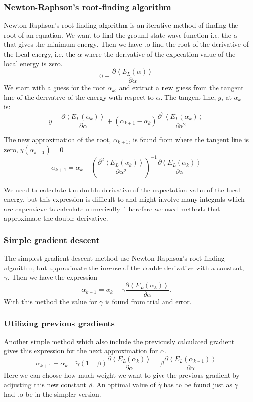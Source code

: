 \subsubsection{Newton-Raphson's root-finding algorithm}
Newton-Raphson's root-finding algorithm is an iterative method of finding the root of an equation. We want to find the ground state wave function i.e. the $\alpha$ that gives the minimum energy. Then we have to find the root of the derivative of the local energy, i.e. the $\alpha$ where the derivative of the expecation value of the local energy is zero.
$$ 0 = \frac{\partial \left<E_L(\alpha)\right>}{\partial \alpha}$$
We start with a guess for the root $\alpha_k$, and extract a new guess from the tangent line of the derivative of the energy with respect to $\alpha$. The tangent line, $y$, at $\alpha_k$ is:
$$y = \frac{\partial \left<E_L(\alpha_k)\right>}{\partial \alpha} + (\alpha_{k+1} - \alpha_k) \frac{\partial^2 \left<E_L(\alpha_k)\right>}{\partial \alpha^2}$$

The new approximation of the root, $\alpha_{k+1}$, is found from where the tangent line is zero, $y(\alpha_{k+1})=0$
$$ \alpha_{k+1} =  \alpha_k - \left(\frac{\partial^2 \left<E_L(\alpha_k)\right>}{\partial \alpha^2}\right)^{-1}\frac{\partial \left<E_L(\alpha_k)\right>}{\partial \alpha} $$

We need to calculate the double derivative of the expectation value of the local energy, but this expression is difficult to and might involve many integrals which are expensicve to calculate numerically. Therefore we used methods that approximate the double derivative. 

\subsubsection{Simple gradient descent}
The simplest gradient descent method use Newton-Raphson's root-finding algorithm, but approximate the inverse of the double derivative with a constant, $\gamma$. Then we have the expression
$$ \alpha_{k+1} =  \alpha_k - \gamma \frac{\partial \left<E_L(\alpha_k)\right>}{\partial \alpha}. $$
With this method the value for $\gamma$ is found from trial and error.

\subsubsection{Utilizing previous gradients}

Another simple method which also include the previously calculated gradient gives this expression for the next approximation for $\alpha$.
$$  \alpha_{k+1} =  \alpha_k - \tilde{\gamma} (1-\beta) \frac{\partial \left<E_L(\alpha_k)\right>}{\partial \alpha} - \beta \frac{\partial \left<E_L(\alpha_{k-1})\right>}{\partial \alpha}  $$
Here we can choose how much weight we want to give the previous gradient by adjusting this new constant $\beta$. An optimal value of $\tilde{\gamma}$ has to be found just as $\gamma$ had to be in the simpler version.

